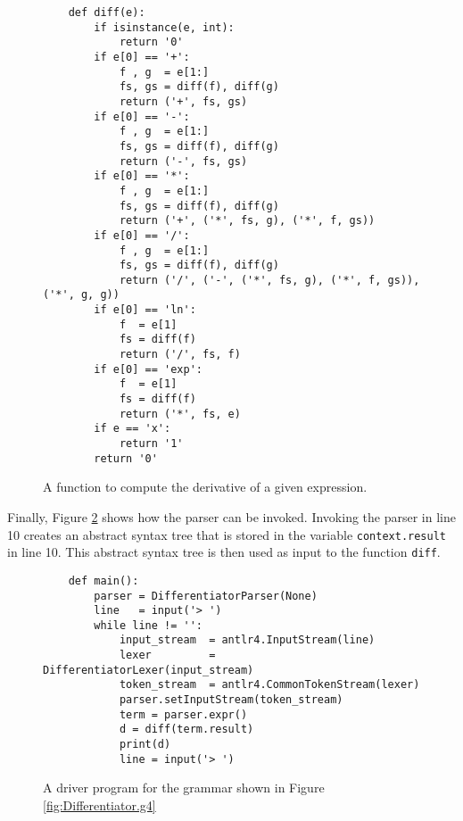 \begin{figure}[!ht]
\centering
\begin{verbatim}
    def diff(e):
        if isinstance(e, int):
            return '0'
        if e[0] == '+':
            f , g  = e[1:]
            fs, gs = diff(f), diff(g)
            return ('+', fs, gs)
        if e[0] == '-':
            f , g  = e[1:]
            fs, gs = diff(f), diff(g)
            return ('-', fs, gs)
        if e[0] == '*':
            f , g  = e[1:]
            fs, gs = diff(f), diff(g)
            return ('+', ('*', fs, g), ('*', f, gs))
        if e[0] == '/':
            f , g  = e[1:]
            fs, gs = diff(f), diff(g)
            return ('/', ('-', ('*', fs, g), ('*', f, gs)), ('*', g, g))
        if e[0] == 'ln':
            f  = e[1]
            fs = diff(f) 
            return ('/', fs, f)
        if e[0] == 'exp':
            f  = e[1]
            fs = diff(f) 
            return ('*', fs, e)
        if e == 'x':
            return '1'
        return '0'
\end{verbatim}
\vspace*{-0.3cm}
\caption{A function to compute the derivative of a given expression.}
\label{fig:Differentiator.ipynb:diff}
\end{figure}


Finally, Figure \ref{fig:Differentiator.ipynb:main} shows how the parser can be invoked.
Invoking the parser in line 10 creates an abstract syntax tree that is stored in the variable
\texttt{context.result} in line 10.  This abstract syntax tree is then used as input to the function
\texttt{diff}. 

\begin{figure}[!ht]
\centering
\begin{verbatim}
    def main():
        parser = DifferentiatorParser(None)
        line   = input('> ')
        while line != '':
            input_stream  = antlr4.InputStream(line)
            lexer         = DifferentiatorLexer(input_stream)
            token_stream  = antlr4.CommonTokenStream(lexer)
            parser.setInputStream(token_stream)
            term = parser.expr()
            d = diff(term.result)
            print(d)
            line = input('> ')
\end{verbatim}
\vspace*{-0.3cm}
\caption{A driver program for the grammar shown in Figure \ref{fig:Differentiator.g4}}
\label{fig:Differentiator.ipynb:main}
\end{figure}
\pagebreak

